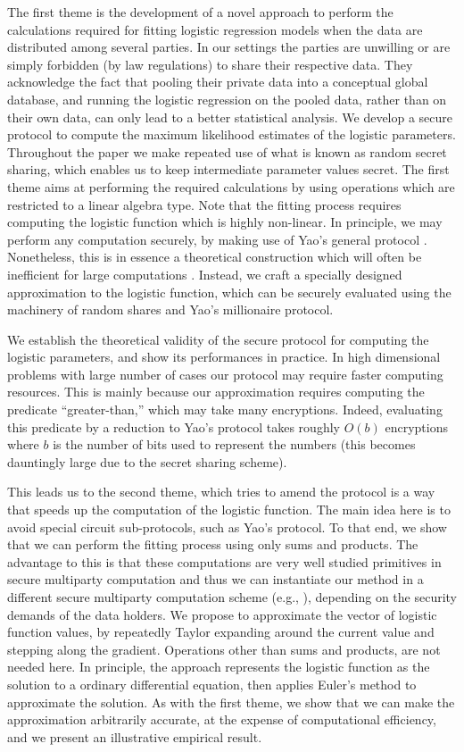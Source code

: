 \documentclass[11pt]{article}
\begin{document}
The first theme is the development of a novel approach to perform the calculations required for fitting logistic regression models when the data are distributed among several parties. In our settings the parties are unwilling or are simply forbidden (by law regulations) to share their respective data. They acknowledge the fact that pooling their private data into a conceptual global database, and running the logistic regression on the pooled data, rather than on their own data, can only lead to a better statistical analysis. We develop a secure protocol to compute the maximum likelihood estimates of the logistic parameters. Throughout the paper we make repeated use of what is known as random secret  sharing, which enables us to keep intermediate parameter values secret. The first theme aims at performing the required calculations by using operations which are restricted to a linear algebra type. Note that the fitting process requires computing the logistic function which is highly non-linear.
In principle, we may perform  any computation securely, by making use of Yao's general protocol \cite{yao82}.  Nonetheless, this is in essence a theoretical construction which will often be inefficient for large computations \cite{ppdm_book}. Instead, we craft a specially designed approximation to the logistic function, which can be securely evaluated using the machinery of random shares and Yao's millionaire protocol.

We establish the theoretical validity of the secure protocol for computing the logistic parameters, and show its performances in practice. In high dimensional problems with large number of cases our protocol may require faster computing resources. This is mainly because our approximation requires computing the predicate ``greater-than,'' which may take many encryptions. Indeed, evaluating this predicate by a reduction to Yao's protocol takes roughly $O(b)$ encryptions where $b$ is the number of bits used to represent the numbers (this becomes dauntingly large due to the secret sharing scheme).

This leads us to the second theme, which tries to amend the protocol is a way that speeds up the computation of the logistic function. The main idea here is to avoid special circuit sub-protocols, such as  Yao's protocol. To that end, we show that we can perform the fitting process  using only sums and products. The advantage to this  is that these computations are very well studied primitives in secure multiparty computation and thus we can instantiate our method in a different secure multiparty computation scheme (e.g., \cite{ppdm_book, goldreich}), depending on the security demands of the data holders. We propose to approximate the vector of logistic function values, by repeatedly Taylor expanding around the current value and stepping along the gradient. Operations other than sums and products, are not needed here.   In principle, the approach represents the logistic function as the solution to a ordinary differential equation, then applies Euler's method to approximate the solution. As with the first theme, we show that we can make  the approximation arbitrarily accurate, at the expense of computational efficiency, and we present an illustrative empirical result.
\end{document}
